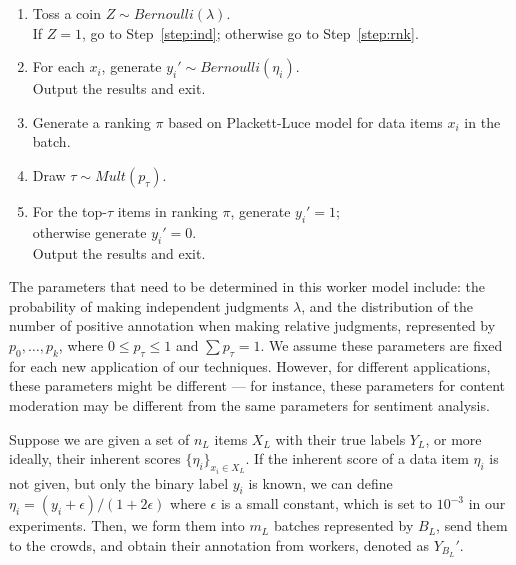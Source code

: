 \begin{enumerate}
  \setlength\itemsep{0.005em}
  \item \label{step:tosscoin}
        Toss a coin $Z \sim Bernoulli(\lambda)$.  \\
        If $Z=1$, go to Step~\ref{step:ind};
        otherwise go to Step~\ref{step:rnk}.
  \item \label{step:ind}
        For each $x_i$, generate $y_i' \sim Bernoulli(\eta_i)$. \\
        Output the results and exit.
  \item \label{step:rnk}
        Generate a ranking $\pi$ based on Plackett-Luce model for data items $x_i$ in the batch.
  \item \label{step:draw}
        Draw $\tau \sim Mult(p_{\tau})$.
  \item \label{step:annotate}
        For the top-$\tau$ items in ranking $\pi$, generate $y_i' = 1$; \\
        otherwise generate $y_i' = 0$.  \\
        Output the results and exit.
\end{enumerate}
\vspace{-0.1in}


The parameters that need to be determined in this worker model include:
the probability of making independent judgments $\lambda$,
and the distribution of the number of positive annotation when making relative judgments,
represented by $p_0, \ldots, p_k$, where $0 \leq p_{\tau} \leq 1$ and $\sum p_{\tau} = 1$.
We assume these parameters are fixed for each new application of our techniques.  
However, for different applications, these parameters might be different --- for instance, 
these parameters for content moderation may be different from the same parameters for sentiment analysis.  




Suppose we are given a set of $n_L$ items $X_L$ with their true labels $Y_L$, 
or more ideally, their inherent scores $\{\eta_i\}_{x_i \in X_L}$.  
If the inherent score of a data item $\eta_i$ is not given, 
but only the binary label $y_i$ is known,
we can define $\eta_i = (y_i + \epsilon)/(1 + 2 \epsilon)$ 
where $\epsilon$ is a small constant, which is set to $10^{-3}$ in our experiments.
Then, we form them into $m_L$ batches represented by $B_L$, send them to the crowds,
and obtain their annotation from workers, denoted as $Y_{B_L}'$.




